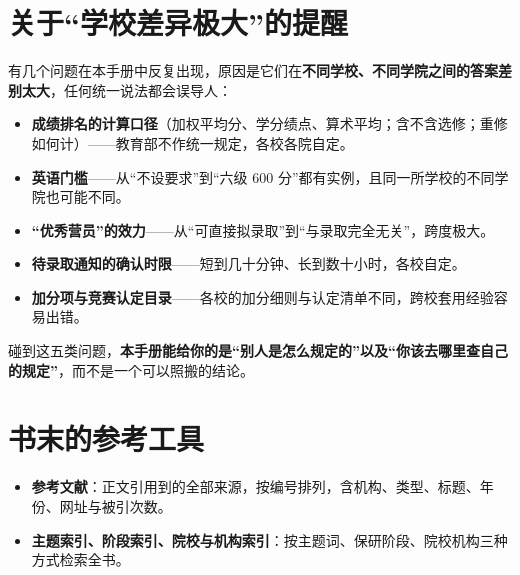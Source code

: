 \section*{关于“学校差异极大”的提醒}

有几个问题在本手册中反复出现，原因是它们在\textbf{不同学校、不同学院之间的答案差别太大}，任何统一说法都会误导人：

\begin{itemize}
\item \textbf{成绩排名的计算口径}（加权平均分、学分绩点、算术平均；含不含选修；重修如何计）——教育部不作统一规定，各校各院自定。
\item \textbf{英语门槛}——从“不设要求”到“六级 600 分”都有实例，且同一所学校的不同学院也可能不同。
\item \textbf{“优秀营员”的效力}——从“可直接拟录取”到“与录取完全无关”，跨度极大。
\item \textbf{待录取通知的确认时限}——短到几十分钟、长到数十小时，各校自定。
\item \textbf{加分项与竞赛认定目录}——各校的加分细则与认定清单不同，跨校套用经验容易出错。
\end{itemize}

碰到这五类问题，\textbf{本手册能给你的是“别人是怎么规定的”以及“你该去哪里查自己的规定”}，而不是一个可以照搬的结论。

\section*{书末的参考工具}

\begin{itemize}
\item \textbf{参考文献}：正文引用到的全部来源，按编号排列，含机构、类型、标题、年份、网址与被引次数。
\item \textbf{主题索引、阶段索引、院校与机构索引}：按主题词、保研阶段、院校机构三种方式检索全书。
\end{itemize}
